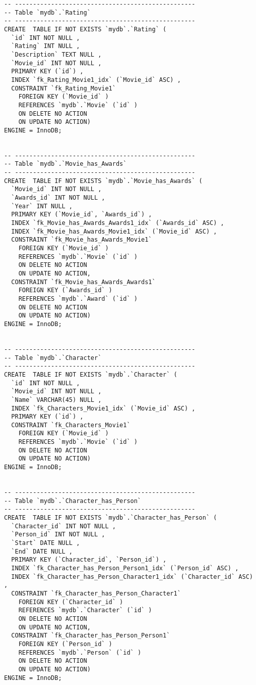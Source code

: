 \begin{lstlisting}[breaklines]
-- --------------------------------------------------
-- Table `mydb`.`Rating`
-- --------------------------------------------------
CREATE  TABLE IF NOT EXISTS `mydb`.`Rating` (
  `id` INT NOT NULL ,
  `Rating` INT NULL ,
  `Description` TEXT NULL ,
  `Movie_id` INT NOT NULL ,
  PRIMARY KEY (`id`) ,
  INDEX `fk_Rating_Movie1_idx` (`Movie_id` ASC) ,
  CONSTRAINT `fk_Rating_Movie1`
    FOREIGN KEY (`Movie_id` )
    REFERENCES `mydb`.`Movie` (`id` )
    ON DELETE NO ACTION
    ON UPDATE NO ACTION)
ENGINE = InnoDB;


-- --------------------------------------------------
-- Table `mydb`.`Movie_has_Awards`
-- --------------------------------------------------
CREATE  TABLE IF NOT EXISTS `mydb`.`Movie_has_Awards` (
  `Movie_id` INT NOT NULL ,
  `Awards_id` INT NOT NULL ,
  `Year` INT NULL ,
  PRIMARY KEY (`Movie_id`, `Awards_id`) ,
  INDEX `fk_Movie_has_Awards_Awards1_idx` (`Awards_id` ASC) ,
  INDEX `fk_Movie_has_Awards_Movie1_idx` (`Movie_id` ASC) ,
  CONSTRAINT `fk_Movie_has_Awards_Movie1`
    FOREIGN KEY (`Movie_id` )
    REFERENCES `mydb`.`Movie` (`id` )
    ON DELETE NO ACTION
    ON UPDATE NO ACTION,
  CONSTRAINT `fk_Movie_has_Awards_Awards1`
    FOREIGN KEY (`Awards_id` )
    REFERENCES `mydb`.`Award` (`id` )
    ON DELETE NO ACTION
    ON UPDATE NO ACTION)
ENGINE = InnoDB;


-- --------------------------------------------------
-- Table `mydb`.`Character`
-- --------------------------------------------------
CREATE  TABLE IF NOT EXISTS `mydb`.`Character` (
  `id` INT NOT NULL ,
  `Movie_id` INT NOT NULL ,
  `Name` VARCHAR(45) NULL ,
  INDEX `fk_Characters_Movie1_idx` (`Movie_id` ASC) ,
  PRIMARY KEY (`id`) ,
  CONSTRAINT `fk_Characters_Movie1`
    FOREIGN KEY (`Movie_id` )
    REFERENCES `mydb`.`Movie` (`id` )
    ON DELETE NO ACTION
    ON UPDATE NO ACTION)
ENGINE = InnoDB;


-- --------------------------------------------------
-- Table `mydb`.`Character_has_Person`
-- --------------------------------------------------
CREATE  TABLE IF NOT EXISTS `mydb`.`Character_has_Person` (
  `Character_id` INT NOT NULL ,
  `Person_id` INT NOT NULL ,
  `Start` DATE NULL ,
  `End` DATE NULL ,
  PRIMARY KEY (`Character_id`, `Person_id`) ,
  INDEX `fk_Character_has_Person_Person1_idx` (`Person_id` ASC) ,
  INDEX `fk_Character_has_Person_Character1_idx` (`Character_id` ASC) ,
  CONSTRAINT `fk_Character_has_Person_Character1`
    FOREIGN KEY (`Character_id` )
    REFERENCES `mydb`.`Character` (`id` )
    ON DELETE NO ACTION
    ON UPDATE NO ACTION,
  CONSTRAINT `fk_Character_has_Person_Person1`
    FOREIGN KEY (`Person_id` )
    REFERENCES `mydb`.`Person` (`id` )
    ON DELETE NO ACTION
    ON UPDATE NO ACTION)
ENGINE = InnoDB;



\end{lstlisting}
